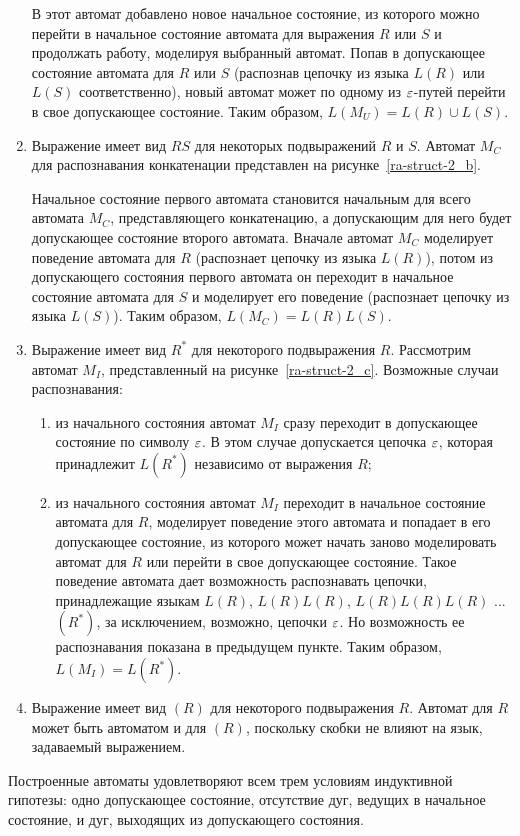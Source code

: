 \begin{myproof}
\begin{enumerate}


В этот автомат добавлено новое начальное состояние, из которого можно перейти в начальное состояние автомата для выражения $R$ или $S$ и продолжать работу, моделируя выбранный автомат. Попав в допускающее состояние автомата для $R$ или $S$ (распознав цепочку из языка $L(R)$ или $L(S)$ соответственно), новый автомат может по одному из $\varepsilon$-путей перейти в свое допускающее состояние. Таким образом,  $L(M_U) = L(R) \cup L(S)$.
	\item Выражение имеет вид $RS$ для некоторых подвыражений $R$ и $S$. Автомат $M_C$ для распознавания конкатенации представлен на рисунке~\ref{ra-struct-2_b}.
	

	
Начальное состояние первого автомата становится начальным для всего автомата $M_C$, представляющего конкатенацию, а допускающим для него будет допускающее состояние второго автомата. Вначале автомат $M_C$ моделирует поведение автомата для $R$ (распознает цепочку из языка $L(R)$), потом из допускающего состояния первого автомата он переходит в начальное состояние автомата для $S$ и моделирует его поведение (распознает цепочку из языка $L(S)$). Таким образом, $L(M_C) = L(R)L(S)$.



\item Выражение имеет вид $R^*$ для некоторого подвыражения $R$. Рассмотрим автомат $M_I$, представленный на рисунке~\ref{ra-struct-2_c}. Возможные случаи распознавания:
	\begin{enumerate}
		\item из начального состояния автомат  $M_I$ сразу переходит в допускающее состояние по символу $\varepsilon$. В этом случае допускается цепочка $\varepsilon$, которая принадлежит $L(R^*)$ независимо от выражения $R$;
		\item из начального состояния автомат  $M_I$ переходит в начальное состояние автомата для $R$, моделирует поведение этого автомата и попадает в его допускающее состояние, из которого может начать заново моделировать автомат для $R$ или перейти в свое допускающее состояние. Такое поведение автомата дает возможность распознавать цепочки, принадлежащие языкам $L(R)$, $L(R)L(R)$, $L(R)L(R)L(R)$ ... $(R^*)$, за исключением, возможно, цепочки $\varepsilon$. Но возможность ее распознавания показана в предыдущем пункте. Таким образом, $L(M_I) = L(R^*)$.
	\end{enumerate}

\item Выражение имеет вид $(R)$ для некоторого подвыражения $R$. Автомат для $R$ может быть автоматом и для $(R)$, поскольку скобки не влияют на язык, задаваемый выражением.

\end{enumerate}
Построенные автоматы удовлетворяют всем трем условиям индуктивной гипотезы: одно допускающее состояние, отсутствие дуг, ведущих в начальное состояние, и дуг, выходящих из допускающего состояния.
\end{myproof}

